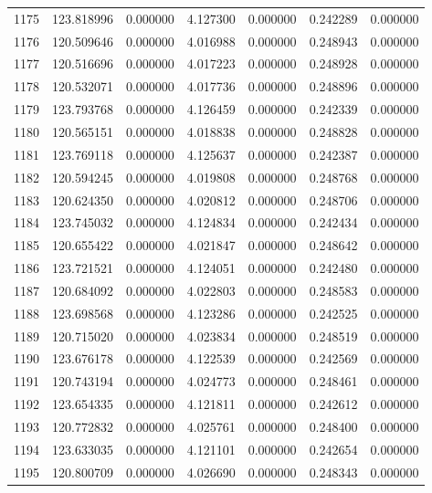 \begin{tabular}{rrrrrrr}
1175 & 123.818996 &    0.000000 &  4.127300 &    0.000000 &    0.242289 &  0.000000 \\
1176 & 120.509646 &    0.000000 &  4.016988 &    0.000000 &    0.248943 &  0.000000 \\
1177 & 120.516696 &    0.000000 &  4.017223 &    0.000000 &    0.248928 &  0.000000 \\
1178 & 120.532071 &    0.000000 &  4.017736 &    0.000000 &    0.248896 &  0.000000 \\
1179 & 123.793768 &    0.000000 &  4.126459 &    0.000000 &    0.242339 &  0.000000 \\
1180 & 120.565151 &    0.000000 &  4.018838 &    0.000000 &    0.248828 &  0.000000 \\
1181 & 123.769118 &    0.000000 &  4.125637 &    0.000000 &    0.242387 &  0.000000 \\
1182 & 120.594245 &    0.000000 &  4.019808 &    0.000000 &    0.248768 &  0.000000 \\
1183 & 120.624350 &    0.000000 &  4.020812 &    0.000000 &    0.248706 &  0.000000 \\
1184 & 123.745032 &    0.000000 &  4.124834 &    0.000000 &    0.242434 &  0.000000 \\
1185 & 120.655422 &    0.000000 &  4.021847 &    0.000000 &    0.248642 &  0.000000 \\
1186 & 123.721521 &    0.000000 &  4.124051 &    0.000000 &    0.242480 &  0.000000 \\
1187 & 120.684092 &    0.000000 &  4.022803 &    0.000000 &    0.248583 &  0.000000 \\
1188 & 123.698568 &    0.000000 &  4.123286 &    0.000000 &    0.242525 &  0.000000 \\
1189 & 120.715020 &    0.000000 &  4.023834 &    0.000000 &    0.248519 &  0.000000 \\
1190 & 123.676178 &    0.000000 &  4.122539 &    0.000000 &    0.242569 &  0.000000 \\
1191 & 120.743194 &    0.000000 &  4.024773 &    0.000000 &    0.248461 &  0.000000 \\
1192 & 123.654335 &    0.000000 &  4.121811 &    0.000000 &    0.242612 &  0.000000 \\
1193 & 120.772832 &    0.000000 &  4.025761 &    0.000000 &    0.248400 &  0.000000 \\
1194 & 123.633035 &    0.000000 &  4.121101 &    0.000000 &    0.242654 &  0.000000 \\
1195 & 120.800709 &    0.000000 &  4.026690 &    0.000000 &    0.248343 &  0.000000 \\

\end{tabular}
